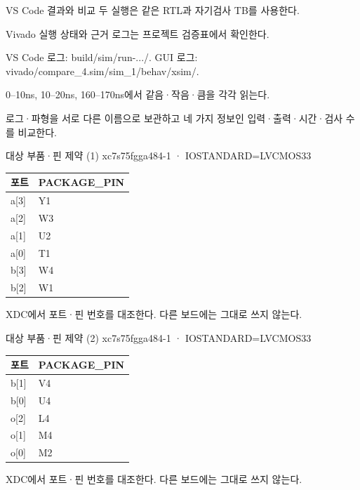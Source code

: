 \begin{frame}{VS Code 결과와 비교}\relax
\small
두 실행은 같은 RTL과 자기검사 TB를 사용한다.\par\vspace{0.22cm}Vivado 실행 상태와 근거 로그는 프로젝트 검증표에서 확인한다.\par\vspace{0.22cm}VS Code 로그: build/sim/run-.../. GUI 로그: vivado/compare\_4.sim/sim\_1/behav/xsim/.\par\vspace{0.22cm}0–10ns, 10–20ns, 160–170ns에서 같음·작음·큼을 각각 읽는다.\par\vspace{0.22cm}로그·파형을 서로 다른 이름으로 보관하고 네 가지 정보인 입력·출력·시간·검사 수를 비교한다.\par
\end{frame}

\begin{frame}{대상 부품·핀 제약 (1)}\relax
\small
xc7s75fgga484-1 · IOSTANDARD=LVCMOS33\par\begin{center}\renewcommand{\arraystretch}{1.45}
\begin{tabular}{l|l}
포트 & PACKAGE\_PIN\\\hline
a[3] & Y1\\
a[2] & W3\\
a[1] & U2\\
a[0] & T1\\
b[3] & W4\\
b[2] & W1\\
\end{tabular}\end{center}
XDC에서 포트·핀 번호를 대조한다. 다른 보드에는 그대로 쓰지 않는다.\par
\end{frame}

\begin{frame}{대상 부품·핀 제약 (2)}\relax
\small
xc7s75fgga484-1 · IOSTANDARD=LVCMOS33\par\begin{center}\renewcommand{\arraystretch}{1.45}
\begin{tabular}{l|l}
포트 & PACKAGE\_PIN\\\hline
b[1] & V4\\
b[0] & U4\\
o[2] & L4\\
o[1] & M4\\
o[0] & M2\\
\end{tabular}\end{center}
XDC에서 포트·핀 번호를 대조한다. 다른 보드에는 그대로 쓰지 않는다.\par
\end{frame}

